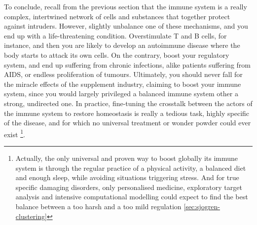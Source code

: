 To conclude, recall from the previous section that the immune system is a really complex, intertwined network of cells and substances that together protect against intruders. However, slightly unbalance one of these mechanisms, and you end up with a life-threatening condition. Overstimulate T and B cells, for instance, and then you are likely to develop an autoimmune disease where the body starts to attack its own cells. On the contrary, boost your regulatory system, and end up suffering from chronic infections, alike patients suffering from AIDS, or endless proliferation of tumours. Ultimately, you should never fall for the miracle effects of the supplement industry, claiming to boost your immune system, since you would largely privileged a balanced immune system other a strong, undirected one. In practice, fine-tuning the crosstalk between the actors of the immune system to restore homeostasis is really a tedious task, highly specific of the disease, and for which no universal treatment or wonder powder could ever exist \footnote{Actually, the only universal and proven way to boost globally its immune system is through the regular practice of a physical activity, a balanced diet and enough sleep, while avoiding situations triggering stress. And for true specific damaging disorders, only personalised medicine, exploratory target analysis and intensive computational modelling could expect to find the best balance between a too harsh and a too mild regulation \ref{sec:sjogren-clustering}}. 












